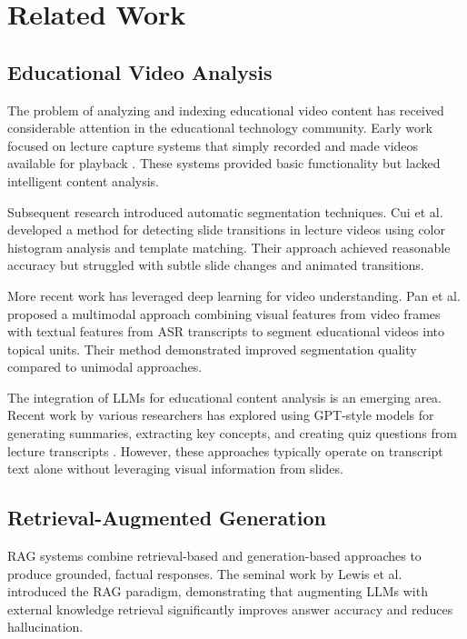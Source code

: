 \documentclass[12pt,a4paper]{article}
\begin{document}
\newpage

\section{Related Work}
\label{sec:related-work}

\subsection{Educational Video Analysis}

The problem of analyzing and indexing educational video content has received considerable attention in the educational technology community. Early work focused on lecture capture systems that simply recorded and made videos available for playback \cite{copeland2009lecture}. These systems provided basic functionality but lacked intelligent content analysis.

Subsequent research introduced automatic segmentation techniques. Cui et al. \cite{cui2016automatic} developed a method for detecting slide transitions in lecture videos using color histogram analysis and template matching. Their approach achieved reasonable accuracy but struggled with subtle slide changes and animated transitions.

More recent work has leveraged deep learning for video understanding. Pan et al. \cite{pan2020educational} proposed a multimodal approach combining visual features from video frames with textual features from ASR transcripts to segment educational videos into topical units. Their method demonstrated improved segmentation quality compared to unimodal approaches.

The integration of LLMs for educational content analysis is an emerging area. Recent work by various researchers has explored using GPT-style models for generating summaries, extracting key concepts, and creating quiz questions from lecture transcripts \cite{chen2023llm}. However, these approaches typically operate on transcript text alone without leveraging visual information from slides.

\subsection{Retrieval-Augmented Generation}

RAG systems combine retrieval-based and generation-based approaches to produce grounded, factual responses. The seminal work by Lewis et al. \cite{lewis2020retrieval} introduced the RAG paradigm, demonstrating that augmenting LLMs with external knowledge retrieval significantly improves answer accuracy and reduces hallucination.
\end{document}
